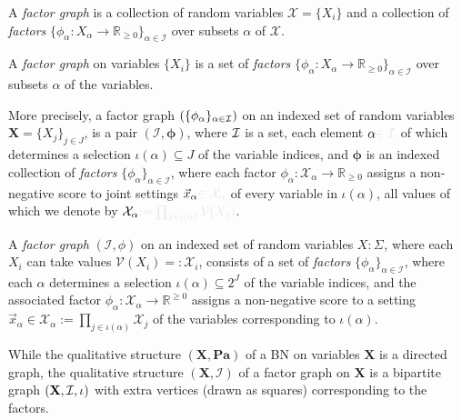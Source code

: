 \documentclass{article}
\newcommand{\notation}[2][]{#1}
\renewcommand{\notation}[2][]{{\color{notationcolor} #2}}
\newcommand{\V}{\mathcal V}
\newcommand{\N}{\mathcal N}
\newcommand{\Ed}{\mathcal E}
\numberwithin{equation}{section}
\begin{document}
	
\begin{quickdefn}
	A \emph{factor graph} is a collection of random variables $\mathcal X = \{X_i\}$ and a collection of \emph{factors} $\{\phi_\alpha\colon X_\alpha \to \mathbb R_{\geq0}\}_{\alpha \in \mathcal I }$ over subsets $\alpha$ of $\mathcal X$.
\end{quickdefn}
	\begin{defn}
		A \emph{factor graph} on variables $\{X_i\}$ is a set of \emph{factors} $\{\phi_\alpha\colon X_\alpha \to \mathbb R_{\geq0}\}_{\alpha \in \mathcal I }$ over subsets $\alpha$ of the variables.
		
		More precisely, a factor graph $ (\{\phi_\alpha\}_{\alpha \in \cal I})$ on an indexed set of random variables $\mathbf X = \{ X_j \}_{j \in J}$, 
		is a pair $(\mathcal I, \boldsymbol\phi)$, where $\cal I$ is a set,
		each element $\alpha\notation{\in \mathcal I}$ of which determines a selection $\iota(\alpha) \subseteq J$ of the variable indices, and
		$\boldsymbol\phi$ is an indexed collection of \emph{factors} $\{\phi_\alpha\}_{\alpha \in \mathcal I }$, 
		where each factor $\phi_\alpha \colon \mathcal X_\alpha \to \mathbb R_{\geq 0}$ assigns a non-negative score to joint settings $\vec x_\alpha \notation{\in \mathcal X_\alpha}$ of every variable in $\iota(\alpha)$, all values of which we denote by $\mathcal X_\alpha\notation{ := \prod_{j \in \iota(\alpha)} \mathcal V(X_j)}$. 
	\end{defn}
\begin{fulldefn}
	A \emph{factor graph} $(\mathcal I, \phi)$ on an indexed set of random variables $X : \Sigma_{}$, where each $X_i$ can take values $\V(X_i) =: \mathcal X_i$, consists of  
	a set of \emph{factors} $\{\phi_\alpha\}_{\alpha \in \mathcal I }$, where each $\alpha$ determines a selection $\iota(\alpha) \subseteq 2^J$ of the variable indices, and the associated factor $\phi_\alpha \colon \mathcal X_\alpha \to \mathbb R^{\geq 0}$ assigns a non-negative score to a setting
	$\vec x_\alpha \in \mathcal X_\alpha := \prod_{j \in \iota(\alpha)} \mathcal X_j$ of the variables corresponding to $\iota(\alpha)$.
	
\end{fulldefn}

	While the qualitative structure $(\mathbf X, \mathbf{Pa})$ of a BN on variables $\mathbf X$ is a directed graph, the qualitative structure $(\mathbf X, \mathcal I)$ of a factor graph on $\mathbf X$ is
	a bipartite graph $({\mathbf X, \cal I}, \iota)$ with extra vertices (drawn as squares) corresponding to the factors. 
	
\end{document}
